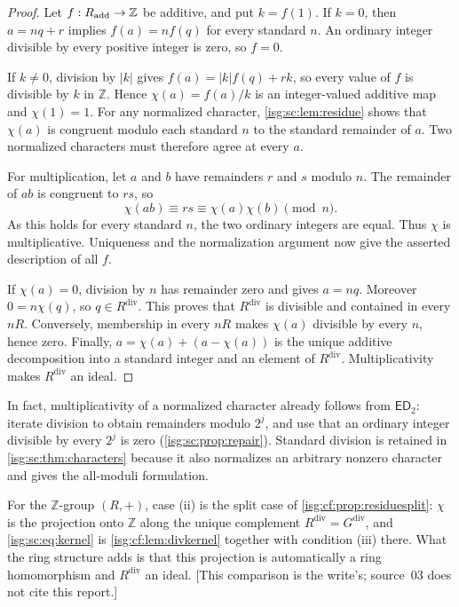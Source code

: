 \documentclass[11pt]{article}
\theoremstyle{definition}
\theoremstyle{remark}
\newcommand{\Z}{\mathbb{Z}}
\newcommand{\dv}{\mathrm{div}}
\newcommand{\ED}{\mathsf{ED}}
\begin{document}
\begin{proof}
Let $f:R_{\rm add}\to\Z$ be additive, and put $k=f(1)$. If $k=0$, then
$a=nq+r$ implies $f(a)=nf(q)$ for every standard $n$. An ordinary integer
divisible by every positive integer is zero, so $f=0$.

If $k\ne0$, division by $|k|$ gives $f(a)=|k|f(q)+rk$, so every value of
$f$ is divisible by $k$ in $\Z$. Hence $\chi(a)=f(a)/k$ is an
integer-valued additive map and $\chi(1)=1$. For any normalized character,
\cref{isg:sc:lem:residue} shows that $\chi(a)$ is congruent modulo each
standard $n$ to the standard remainder of $a$. Two normalized characters
must therefore agree at every $a$.

For multiplication, let $a$ and $b$ have remainders $r$ and $s$ modulo
$n$. The remainder of $ab$ is congruent to $rs$, so
\[
 \chi(ab)\equiv rs\equiv\chi(a)\chi(b)\pmod n.
\]
As this holds for every standard $n$, the two ordinary integers are equal.
Thus $\chi$ is multiplicative. Uniqueness and the normalization argument
now give the asserted description of all $f$.

If $\chi(a)=0$, division by $n$ has remainder zero and gives $a=nq$.
Moreover $0=n\chi(q)$, so $q\in R^{\dv}$. This proves that $R^{\dv}$ is
divisible and contained in every $nR$. Conversely, membership in every
$nR$ makes $\chi(a)$ divisible by every $n$, hence zero. Finally,
$a=\chi(a)+(a-\chi(a))$ is the unique additive decomposition into a
standard integer and an element of $R^{\dv}$. Multiplicativity makes
$R^{\dv}$ an ideal.
\end{proof}

In fact, multiplicativity of a normalized character already follows from
$\ED_2$: iterate division to obtain remainders modulo $2^j$, and use that
an ordinary integer divisible by every $2^j$ is zero
(\cref{isg:sc:prop:repair}). Standard division is retained in
\cref{isg:sc:thm:characters} because it also normalizes an arbitrary
nonzero character and gives the all-moduli formulation.

For the $\Z$-group $(R,+)$, case (ii) is the split case of
\cref{isg:cf:prop:residuesplit}: $\chi$ is the projection onto $\Z$ along
the unique complement $R^{\dv}=G^{\dv}$, and \eqref{isg:sc:eq:kernel} is
\cref{isg:cf:lem:divkernel} together with condition (iii) there. What the
ring structure adds is that this projection is automatically a ring
homomorphism and $R^{\dv}$ an ideal. \textup{[}This comparison is the
write's; source~03 does not cite this report.\textup{]}
\end{document}
